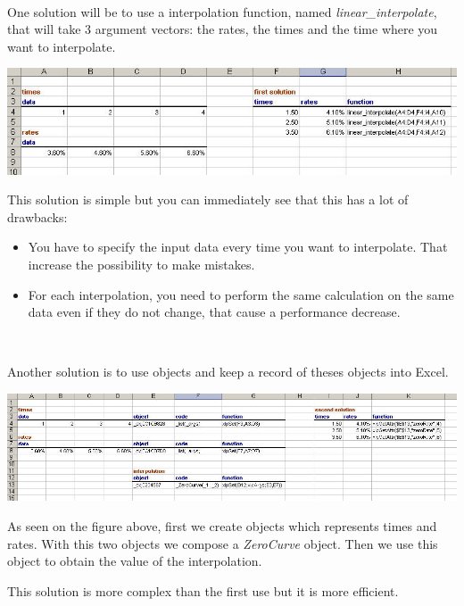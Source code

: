 \

One solution will be to use a interpolation function, named {\it linear\_interpolate}, that will take 3 argument vectors: the rates, the times and the time where you want to interpolate.  

\begin{center}
\includegraphics[width=16cm]{images/intex1.jpg}
\end{center}

This solution is simple but you can immediately see that this has a lot of drawbacks:

\begin{itemize}
\item You have to specify the input data every time you want to interpolate. That increase the possibility to make mistakes.
\item For each interpolation, you need to perform the same calculation on the same data even if they do not change, that cause a performance decrease. 
\end{itemize}

\

Another solution is to use objects and keep a record of theses objects into Excel.

\begin{center}
\includegraphics[width=16cm]{images/intex2.jpg}
\end{center}

As seen on the figure above, first we create objects which represents times and rates. With this two objects we compose a {\it ZeroCurve} object. Then we use this object to obtain the value of the interpolation.

This solution is more complex than the first use but it is more efficient.

